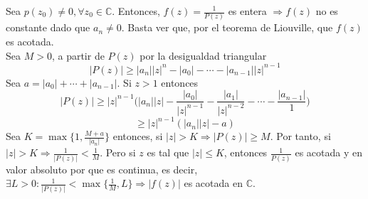 \begin{dem}
  Sea $p(z_{0}) \neq 0, \forall z_{0} \in \mathbb{C}$. Entonces, $f(z) = \frac{1}{P(z)}$ es entera $\Rightarrow f(z)$ no es constante dado que $a_{n} \neq 0$. Basta ver que, por el teorema de Liouville, que $f(z)$ es acotada. \\

  Sea $M>0$, a partir de $P(z)$ por la desigualdad triangular
  \[ 
    | P(z) | \geq | a_{n} || z |^{n} - | a_{0} | - \cdots - | a_{n-1} || z |^{n-1} 
  \] 
  Sea $a = | a_{0} | + \cdots + | a_{n-1} |$. Si $z > 1$ entonces
  \[ 
    | P(z) | \geq | z |^{n-1} \Bigg ( | a_{n} || z | - \frac{| a_{0} |}{| z |^{n-1}} - \frac{| a_{1} |}{| z |^{n-2}} - \cdots - \frac{| a_{n-1} |}{1} \Bigg )
  \] 
  \[ 
    \geq | z |^{n-1}(| a_{n} || z | - a)
  \] 
  Sea $ K = \max \{ 1, \frac{M+ a}{| a_{n} |} \}$ entonces,  si $| z | > K \Rightarrow | P(z) | \geq M$. Por tanto, si $| z | > K \Rightarrow \frac{1}{| P(z) |} < \frac{1}{M}$. Pero si $z$ es tal que $| z | \leq K$, entonces $ \frac{1}{P(z)}$ es acotada y en valor absoluto por que es continua, es decir, $\exists L >0 : \frac{1}{| P(z) |} < \max \{ \frac{1}{M}, L \} \Rightarrow | f(z) |$ es acotada en $\mathbb{C}$.
\end{dem}
